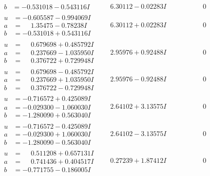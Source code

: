 \documentclass[1p]{elsarticle_modified}
\theoremstyle{definition}
\begin{document}
$$\begin{array}{c|c|c}
\begin{aligned}
b &= -0.531018 - 0.543116 I\end{aligned}
 & \phantom{-}6.30112 - 0.02283 I & \phantom{-0.000000 } 0 \\ \hline\begin{aligned}
u &= -0.605587 - 0.994069 I \\
a &= \phantom{-}1.35475 - 0.78238 I \\
b &= -0.531018 + 0.543116 I\end{aligned}
 & \phantom{-}6.30112 + 0.02283 I & \phantom{-0.000000 } 0 \\ \hline\begin{aligned}
u &= \phantom{-}0.679698 + 0.485792 I \\
a &= \phantom{-}0.237669 - 1.035950 I \\
b &= \phantom{-}0.376722 + 0.729948 I\end{aligned}
 & \phantom{-}2.95976 + 0.92488 I & \phantom{-0.000000 } 0 \\ \hline\begin{aligned}
u &= \phantom{-}0.679698 - 0.485792 I \\
a &= \phantom{-}0.237669 + 1.035950 I \\
b &= \phantom{-}0.376722 - 0.729948 I\end{aligned}
 & \phantom{-}2.95976 - 0.92488 I & \phantom{-0.000000 } 0 \\ \hline\begin{aligned}
u &= -0.716572 + 0.425089 I \\
a &= -0.029300 - 1.060030 I \\
b &= -1.280090 + 0.563040 I\end{aligned}
 & \phantom{-}2.64102 + 3.13575 I & \phantom{-0.000000 } 0 \\ \hline\begin{aligned}
u &= -0.716572 - 0.425089 I \\
a &= -0.029300 + 1.060030 I \\
b &= -1.280090 - 0.563040 I\end{aligned}
 & \phantom{-}2.64102 - 3.13575 I & \phantom{-0.000000 } 0 \\ \hline\begin{aligned}
u &= \phantom{-}0.511208 + 0.657131 I \\
a &= \phantom{-}0.741436 + 0.404517 I \\
b &= -0.771755 - 0.186005 I\end{aligned}
 & \phantom{-}0.27239 + 1.87412 I & \phantom{-0.000000 } 0 \\ \hline\begin{aligned}

\end{aligned}
\end{array}$$
\end{document}
